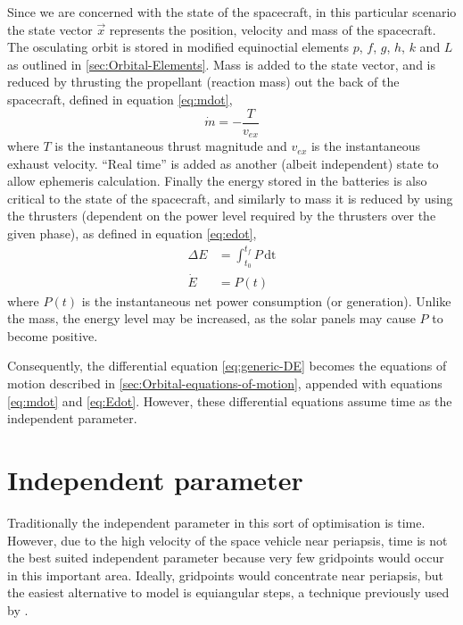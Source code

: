 Since we are concerned with the state of the spacecraft, in this particular scenario the state vector $\vec{x}$ represents the position, velocity and mass of the spacecraft. The osculating orbit is stored in modified equinoctial elements $p$, $f$, $g$, $h$, $k$ and $L$ as outlined in \autoref{sec:Orbital-Elements}. Mass is added to the state vector, and is reduced by thrusting the propellant (reaction mass) out the back of the spacecraft, defined in equation \eqref{eq:mdot},
\begin{equation}
\dot{m}=-\frac{T}{v_{ex}} \label{eq:mdot}
\end{equation}
where $T$ is the instantaneous thrust magnitude and $v_{ex}$ is the instantaneous exhaust velocity. \enquote{Real time} is added as another (albeit independent) state to allow ephemeris calculation. Finally the energy stored in the batteries is also critical to the state of the spacecraft, and similarly to mass it is reduced by using the thrusters (dependent on the power level required by the thrusters over the given phase), as defined in equation \eqref{eq:edot}, 
\begin{subequations}\label{eq:edot}
\begin{align}
\Delta E &= \int_{t_0}^{t_f} P\,\text{dt} \label{eq:delta-E}\\
\dot{E} &= P(t) \label{eq:Edot}
\end{align} 
\end{subequations} where $P(t)$ is the instantaneous net power consumption (or generation). Unlike the mass, the energy level may be increased, as the solar panels may cause $P$ to become positive.

Consequently, the differential equation \eqref{eq:generic-DE} becomes the equations of motion described in \autoref{sec:Orbital-equations-of-motion}, appended with equations \eqref{eq:mdot} and \eqref{eq:Edot}. However, these differential equations assume time as the independent parameter.

\section{Independent parameter} \label{sec:Independent-parameter}

Traditionally the independent parameter in this sort of optimisation is time. However, due to the high velocity of the space vehicle near periapsis, time is not the best suited independent parameter because very few gridpoints would occur in this important area. Ideally, gridpoints would concentrate near periapsis, but the easiest alternative to model is equiangular steps, a technique previously used by \textcite{Betts2003}. 

